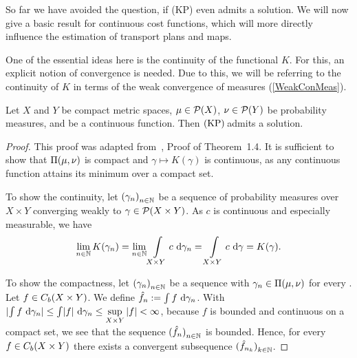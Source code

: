 So far we have avoided the question, if (KP) even admits a solution. We will now give a basic result for continuous cost functions, which will more directly influence the estimation of transport plans and maps.

One of the essential ideas here is the continuity of the functional $K$. For this, an explicit notion of convergence is needed. Due to this, we will be referring to the continuity of $K$ in terms of the weak convergence of measures (\ref{WeakConMeas}).

\begin{lemma}\label{KPAdmitCompCont}
	Let $X$ and $Y$ be compact metric spaces, $\mu \in \PM{X}$, $\nu \in \PM{Y}$ be probability measures, and  be a continuous function. Then$\text{\normalfont\ (KP)\,}$admits a solution.
\end{lemma}

\begin{proof}
	This proof was adapted from~\cite{San2015}, Proof of Theorem~1.4. It is sufficient to show that $\TP{\mu}{\nu}$ is compact and $\gamma \mapsto K(\gamma)$ is continuous, as any continuous function attains its minimum over a compact set.

	To show the continuity, let ${(\gamma_n)}_{\NinN}$ be a sequence of probability measures over $X \times Y$ converging weakly to $\gamma \in \PM{X \times Y}$. As $c$ is continuous and especially measurable, we have
	\[ \lim\limits_{\NinN} K(\gamma_n) = \lim\limits_{\NinN} \int\limits_{X \times Y} c~\D[\gamma_n] = \int\limits_{X \times Y} c~\D[\gamma] = K(\gamma). \] 
	
	To show the compactness, let ${(\gamma_n)}_{\NinN}$ be a sequence with $\gamma_n \in \TP{\mu}{\nu}$ for every \NinN. Let $f \in \CF[b]{X \times Y}$. We define $\hat{f}_n := \int f~\D[\gamma_n]$. With $\lvert \int f~\D[\gamma_n] \rvert \le \int \lvert f \rvert~\D[\gamma_n] \le \sup\limits_{X \times Y} |f| < \infty$, because $f$ is bounded and continuous on a compact set, we see that the sequence ${(\hat{f}_n)}_{\NinN}$ is bounded. Hence, for every $f \in \CF[b]{X \times Y}$ there exists a convergent subsequence ${(\hat{f}_{n_k})}_{\NinN[k]}$.
\end{proof}

